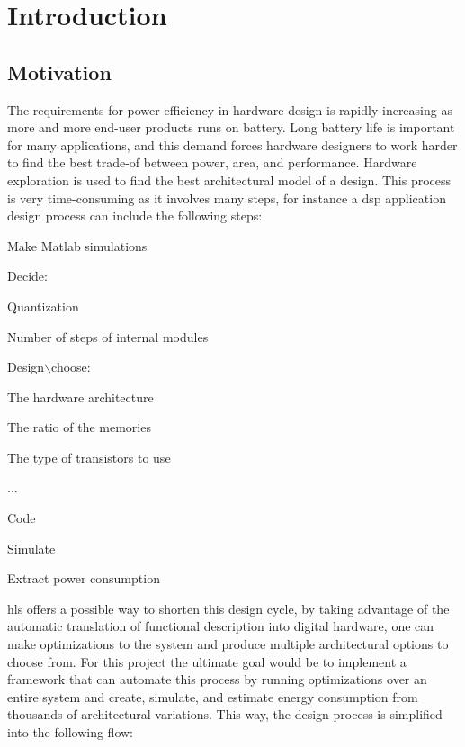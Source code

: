 \chapter{Introduction}
\label{chp:introduction} 
\section{\label{sec:motivation}Motivation}
The requirements for power efficiency in hardware design is rapidly increasing as more and more end-user products runs on battery. Long battery life is important for many applications, and this demand forces hardware designers to work harder to find the best trade-of between power, area, and performance. Hardware exploration is used to find the best architectural model of a design. This process is very time-consuming as it involves many steps, for instance a \gls{dsp} application design process can include the following steps:
\begin{compactenum}
    \item Make Matlab simulations 
    \item Decide:
    \begin{compactitem}
        \item Quantization
        \item Number of steps of internal modules
    \end{compactitem}
    \item Design$\backslash$choose:
    \begin{compactitem}
        \item The hardware architecture
        \item The ratio of the memories
        \item The type of transistors to use
    \end{compactitem}
    \item ...
    \item Code
    \item Simulate
    \item Extract power consumption
\end{compactenum}
\gls{hls} offers a possible way to shorten this design cycle, by taking advantage of the automatic translation of functional description into digital hardware, one can make optimizations to the system and produce multiple architectural options to choose from. For this project the ultimate goal would be to implement a framework that can automate this process by running optimizations over an entire system and create, simulate, and estimate energy consumption from thousands of architectural variations. This way, the design process is simplified into the following flow:
